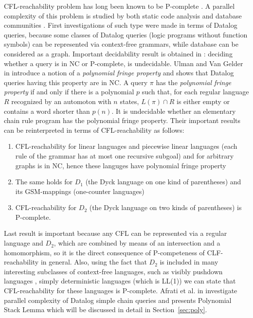 \documentclass[smallextended]{svjour3}       %
\begin{document}
CFL-reachability problem has long been known to be P-complete \cite{PCompl}. A parallel complexity of this problem is studied by both static code analysis \cite*{RepSeq, RepsBasic} and database communities \cite*{ChainQ, Ullman, Yannakakis}. First investigations of such type were made in terms of Datalog queries, because some classes of Datalog queries (logic programs
without function symbols) can be represented via context-free grammars, while database can be considered as a graph. Important decidability result is obtained in \cite{Vardi}: deciding whether a query is in NC or P-complete, is undecidable. Ulman and Van Gelder in \cite{Ullman} introduce a notion of a  \textit{polynomial fringe property} and shows that Datalog queries having this property are in NC. A query $\pi$ has the \textit{polynomial fringe property} if and only if there is a polynomial $p$ such that, for each regular language $R$ recognized by an automoton with $n$ states, $L(\pi) \cap R$ is either empty or contains a word shorter than $p(n)$. It is undecidable whether an elementary chain rule program has the polynomial fringe property. Their important results can be reinterpreted in terms of CFL-reachability as follows: 
\begin{enumerate}
\item CFL-reachability for linear languages and piecewise linear languages (each rule of the grammar has at most one recursive subgoal) and for arbitrary graphs is in NC, hence these languges have polynomial fringe property
\item The same holds for $D_1$ (the Dyck language on one kind of parentheses) and its GSM-mappings (one-counter languages)
\item CFL-reachability for $D_2$ (the Dyck language on two kinds of parentheses) is P-complete.
\end{enumerate}
Last result is important because any CFL can be represented via a regular language and $D_2$, which are combined by means of an intersection and a homomorphism, so it is the direct consequence of P-competeness of CLF-reachability in general. Also, using the fact that $D_2$ is included in many interesting subclasses of context-free languages, such as visibly pushdown languages \cite{Okhotin2014ComplexityOI}, simply deterministic languages (which is LL(1)) we can state that CFL-reachability for these languages is P-complete. Afrati et al. in \cite{ChainQ} investigate parallel complexity of Datalog simple chain queries and presents Polynomial Stack Lemma which will be discussed in detail in Section~\ref{sec:poly}. 
\end{document}
